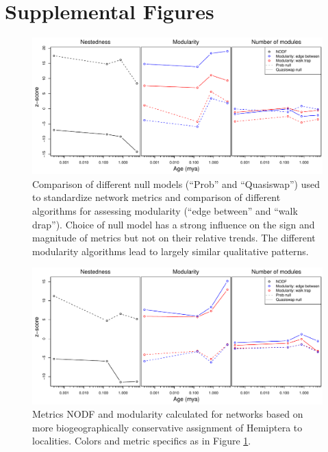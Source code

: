\documentclass[12pt]{article}
\begin{document}



\clearpage

\section{Supplemental Figures}

\begin{figure}[!hp]
  \centering
  \includegraphics[scale=0.6]{../figSupp_netMetComp.pdf}
  \caption{Comparison of different null models (``Prob'' and
    ``Quasiswap'') used to standardize network metrics and comparison
    of different algorithms for assessing modularity (``edge between''
    and ``walk drap''). Choice of null model has a strong influence
    on the sign and magnitude of metrics but not on their relative
    trends. The different modularity algorithms lead to largely
    similar qualitative patterns.}
  \label{figSupp:netMetComp}
\end{figure}

\begin{figure}[!hp]
  \centering
  \includegraphics[scale=0.6]{../figSupp_netMetCons.pdf}
  \caption{Metrics NODF and modularity calculated for networks based
    on more biogeographically conservative assignment of Hemiptera to
    localities. Colors and metric specifics as in Figure
    \ref{figSupp:netMetComp}.}
  \label{figSupp:netCons}
\end{figure}
\end{document}
